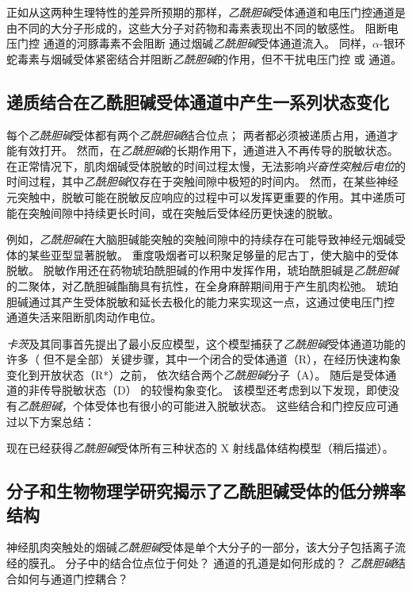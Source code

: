 正如从这两种生理特性的差异所预期的那样，\textit{乙酰胆碱}受体通道和电压门控通道是由不同的大分子形成的，这些大分子对药物和毒素表现出不同的敏感性。
阻断电压门控  通道的河豚毒素不会阻断  通过烟碱\textit{乙酰胆碱}受体通道流入。
同样，$\alpha$-银环蛇毒素与烟碱受体紧密结合并阻断\textit{乙酰胆碱}的作用，但不干扰电压门控  或  通道。



\subsection{递质结合在乙酰胆碱受体通道中产生一系列状态变化}

每个\textit{乙酰胆碱}受体都有两个\textit{乙酰胆碱}结合位点；
两者都必须被递质占用，通道才能有效打开。
然而，在\textit{乙酰胆碱}的长期作用下，通道进入不再传导的脱敏状态。
在正常情况下，肌肉烟碱受体脱敏的时间过程太慢，无法影响\textit{兴奋性突触后电位}的时间过程，其中\textit{乙酰胆碱}仅存在于突触间隙中极短的时间内。
然而，在某些神经元突触中，脱敏可能在脱敏反应响应的过程中可以发挥更重要的作用。其中递质可能在突触间隙中持续更长时间，或在突触后受体经历更快速的脱敏。


例如，\textit{乙酰胆碱}在大脑胆碱能突触的突触间隙中的持续存在可能导致神经元烟碱受体的某些亚型显著脱敏。
重度吸烟者可以积聚足够量的尼古丁，使大脑中的受体脱敏。
脱敏作用还在药物琥珀酰胆碱的作用中发挥作用，琥珀酰胆碱是\textit{乙酰胆碱}的二聚体，对乙酰胆碱酯酶具有抗性，在全身麻醉期间用于产生肌肉松弛。
琥珀胆碱通过其产生受体脱敏和延长去极化的能力来实现这一点，这通过使电压门控  通道失活来阻断肌肉动作电位。


\textit{卡茨}及其同事首先提出了最小反应模型，这个模型捕获了\textit{乙酰胆碱}受体通道功能的许多（ 但不是全部）关键步骤，其中一个闭合的受体通道（R），在经历快速构象变化到开放状态（R*）之前， 依次结合两个\textit{乙酰胆碱}分子（A）。
随后是受体通道的非传导脱敏状态（D） 的较慢构象变化。
该模型还考虑到以下发现，即使没有\textit{乙酰胆碱}，个体受体也有很小的可能进入脱敏状态。
这些结合和门控反应可通过以下方案总结：


现在已经获得\textit{乙酰胆碱}受体所有三种状态的 X 射线晶体结构模型（稍后描述）。



\subsection{分子和生物物理学研究揭示了乙酰胆碱受体的低分辨率结构}

神经肌肉突触处的烟碱\textit{乙酰胆碱}受体是单个大分子的一部分，该大分子包括离子流经的膜孔。
分子中的结合位点位于何处？ 通道的孔道是如何形成的？
\textit{乙酰胆碱}结合如何与通道门控耦合？


